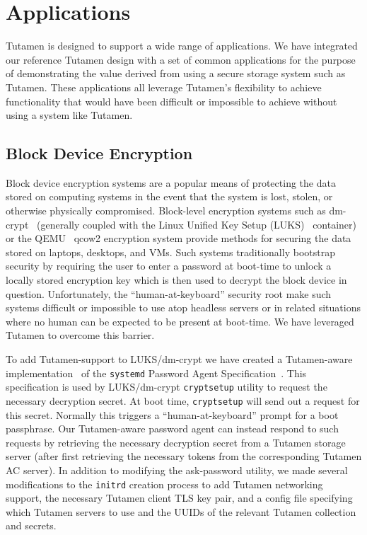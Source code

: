 \section{Applications}
\label{sec:apps}

Tutamen is designed to support a wide range of applications. We have
integrated our reference Tutamen design with a set of common
applications for the purpose of demonstrating the value derived from
using a secure storage system such as Tutamen. These applications all
leverage Tutamen's flexibility to achieve functionality that would
have been difficult or impossible to achieve without using a system
like Tutamen.

\subsection{Block Device Encryption}

Block device encryption systems are a popular means of protecting the
data stored on computing systems in the event that the system is lost,
stolen, or otherwise physically compromised.  Block-level encryption
systems such as dm-crypt~\cite{dm-crypt} (generally coupled with the
Linux Unified Key Setup (LUKS)~\cite{luks} container) or the
QEMU~\cite{qemu} qcow2 encryption system provide methods for securing
the data stored on laptops, desktops, and VMs. Such systems
traditionally bootstrap security by requiring the user to enter a
password at boot-time to unlock a locally stored encryption key which
is then used to decrypt the block device in question. Unfortunately,
the ``human-at-keyboard'' security root make such systems difficult or
impossible to use atop headless servers or in related situations where
no human can be expected to be present at boot-time. We have leveraged
Tutamen to overcome this barrier.

To add Tutamen-support to LUKS/dm-crypt we have created a Tutamen-aware
implementation~\cite{src-tutamen-askpassword} of the \texttt{systemd}
Password Agent Specification~\cite{systemd-passwordagents}. This
specification is used by LUKS/dm-crypt \texttt{cryptsetup} utility to
request the necessary decryption secret. At boot time,
\texttt{cryptsetup} will send out a request for this secret. Normally
this triggers a ``human-at-keyboard'' prompt for a boot
passphrase. Our Tutamen-aware password agent can instead respond to
such requests by retrieving the necessary decryption secret from a
Tutamen storage server (after first retrieving the necessary tokens
from the corresponding Tutamen AC server). In addition to modifying
the ask-password utility, we made several modifications to the
\texttt{initrd} creation process to add Tutamen networking support,
the necessary Tutamen client TLS key pair, and a config file
specifying which Tutamen servers to use and the UUIDs of the relevant
Tutamen collection and secrets.

